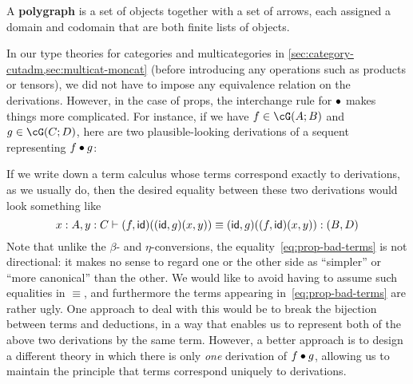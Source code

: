 \begin{props}
\begin{defn}
  A \textbf{polygraph} \cG is a set of objects together with a set of arrows, each assigned a domain and codomain that are both finite lists of objects.
\end{defn}

In our type theories for categories and multicategories in \cref{sec:category-cutadm,sec:multicat-moncat} (before introducing any operations such as products or tensors), we did not have to impose any equivalence relation on the derivations.
However, in the case of props, the interchange rule for $\bullet$ makes things more complicated.
For instance, if we have $f\in \cG(A;B)$ and $g\in\cG(C;D)$, here are two plausible-looking derivations of a sequent representing $f\bullet g$:
If we write down a term calculus whose terms correspond exactly to derivations, as we usually do, then the desired equality between these two derivations would look something like
\begin{equation}
  x:A, y:C \types (f,\idfunc)((\idfunc,g)(x,y)) \equiv (\idfunc,g)((f,\idfunc)(x,y)) : (B,D)\label{eq:prop-bad-terms}
\end{equation}
Note that unlike the $\beta$- and $\eta$-conversions, the equality~\eqref{eq:prop-bad-terms} is not directional: it makes no sense to regard one or the other side as ``simpler'' or ``more canonical'' than the other.
We would like to avoid having to assume such equalities in $\equiv$, and furthermore the terms appearing in~\eqref{eq:prop-bad-terms} are rather ugly.
One approach to deal with this would be to break the bijection between terms and deductions, in a way that enables us to represent both of the above two derivations by the same term.
However, a better approach is to design a different theory in which there is only \emph{one} derivation of $f\bullet g$, allowing us to maintain the principle that terms correspond uniquely to derivations.


\end{props}
